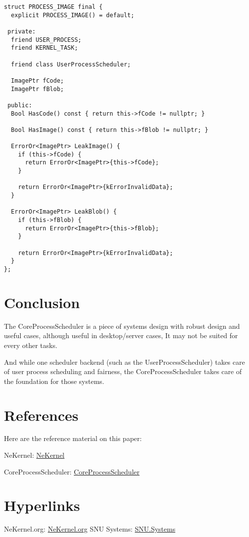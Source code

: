 \documentclass{article}
\begin{document}
\begin{verbatim}
struct PROCESS_IMAGE final {
  explicit PROCESS_IMAGE() = default;

 private:
  friend USER_PROCESS;
  friend KERNEL_TASK;

  friend class UserProcessScheduler;

  ImagePtr fCode;
  ImagePtr fBlob;

 public:
  Bool HasCode() const { return this->fCode != nullptr; }

  Bool HasImage() const { return this->fBlob != nullptr; }

  ErrorOr<ImagePtr> LeakImage() {
    if (this->fCode) {
      return ErrorOr<ImagePtr>{this->fCode};
    }

    return ErrorOr<ImagePtr>{kErrorInvalidData};
  }

  ErrorOr<ImagePtr> LeakBlob() {
    if (this->fBlob) {
      return ErrorOr<ImagePtr>{this->fBlob};
    }

    return ErrorOr<ImagePtr>{kErrorInvalidData};
  }
};

\end{verbatim}

\section{Conclusion}

{The CoreProcessScheduler is a piece of systems design with robust design and useful cases, although useful in desktop/server cases, It may not be suited for every other tasks.}

{And while one scheduler backend (such as the UserProcessScheduler) takes care of user process scheduling and fairness, the CoreProcessScheduler takes care of the foundation for those systems.}

\section{References}

{Here are the reference material on this paper:}

{NeKernel}: \href{https://github.com/nekernel-org/nekernel}{NeKernel}

{CoreProcessScheduler}: \href{https://github.com/nekernel-org/nekernel/blob/dev/dev/kernel/KernelKit/CoreProcessScheduler.h}{CoreProcessScheduler}

\section{Hyperlinks}

{NeKernel.org}: \href{https://nekernel.org}{NeKernel.org}
\newline
\newline
{SNU Systems}: \href{https://snu.systems}{SNU.Systems}
\end{document}
